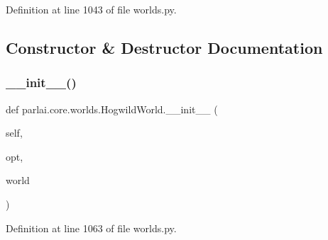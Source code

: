 Definition at line 1043 of file worlds.\+py.



\subsection{Constructor \& Destructor Documentation}
\mbox{\label{classparlai_1_1core_1_1worlds_1_1HogwildWorld_a99acf6286bf07b0967979dd134768cd8}} 
\subsubsection{\texorpdfstring{\+\_\+\+\_\+init\+\_\+\+\_\+()}{\_\_init\_\_()}}
{\footnotesize\ttfamily def parlai.\+core.\+worlds.\+Hogwild\+World.\+\_\+\+\_\+init\+\_\+\+\_\+ (\begin{DoxyParamCaption}\item[{}]{self,  }\item[{}]{opt,  }\item[{}]{world }\end{DoxyParamCaption})}



Definition at line 1063 of file worlds.\+py.


